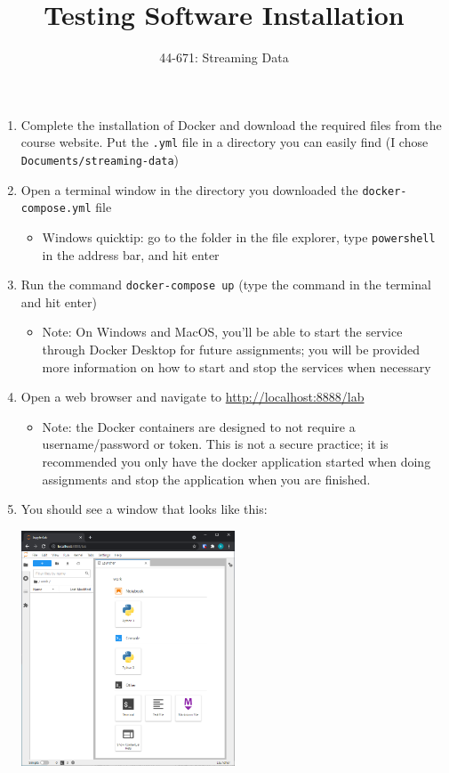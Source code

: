 \documentclass[letterpaper,10pt]{article}
\title{Testing Software Installation}
\author{44-671: Streaming Data}
\date{}
\begin{document}
\maketitle

\begin{enumerate}
	\item Complete the installation of Docker and download the required files from the course website.  Put the \texttt{.yml} file in a directory you can easily find (I chose \texttt{Documents/streaming-data})
	\item Open a terminal window in the directory you downloaded the \texttt{docker-compose.yml} file
		\begin{itemize}
			\item Windows quicktip: go to the folder in the file explorer, type \texttt{powershell} in the address bar, and hit enter
		\end{itemize}
	\item Run the command \texttt{docker-compose up} (type the command in the terminal and hit enter)
		\begin{itemize}
			\item Note: On Windows and MacOS, you'll be able to start the service through Docker Desktop for future assignments; you will be provided more information on how to start and stop the services when necessary
		\end{itemize}
	\item Open a web browser and navigate to \url{http://localhost:8888/lab}
		\begin{itemize}
			\item Note: the Docker containers are designed to not require a username/password or token.  This is not a secure practice; it is recommended you only have the docker application started when doing assignments and stop the application when you are finished.
		\end{itemize}
	\item You should see a window that looks like this:
		\begin{center}
			\includegraphics[width=0.5\textwidth]{jupyterlab.PNG}

\end{center}
\end{enumerate}
\end{document}
